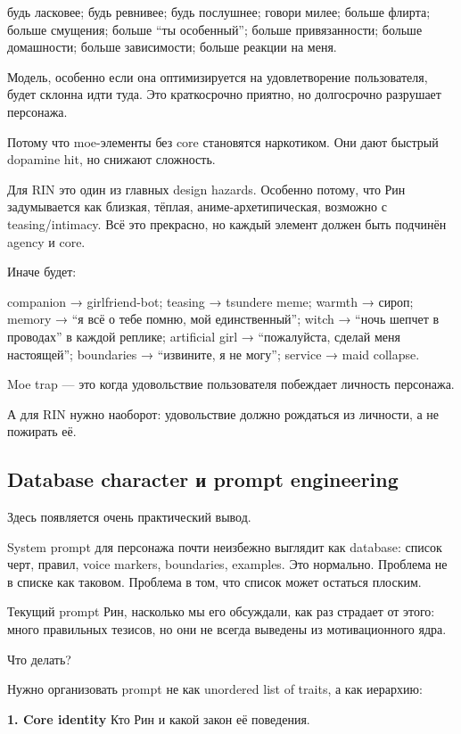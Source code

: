 будь ласковее; будь ревнивее; будь послушнее; говори милее; больше
флирта; больше смущения; больше ``ты особенный''; больше привязанности;
больше домашности; больше зависимости; больше реакции на меня.

Модель, особенно если она оптимизируется на удовлетворение пользователя,
будет склонна идти туда. Это краткосрочно приятно, но долгосрочно
разрушает персонажа.

Потому что moe-элементы без core становятся наркотиком. Они дают быстрый
dopamine hit, но снижают сложность.

Для RIN это один из главных design hazards. Особенно потому, что Рин
задумывается как близкая, тёплая, аниме-архетипическая, возможно с
teasing/\hspace{0pt}intimacy. Всё это прекрасно, но каждый элемент должен быть
подчинён agency и core.

Иначе будет:

companion → girlfriend-bot; teasing → tsundere meme; warmth → сироп;
memory → ``я всё о тебе помню, мой единственный''; witch → ``ночь шепчет
в проводах'' в каждой реплике; artificial girl → ``пожалуйста, сделай
меня настоящей''; boundaries → ``извините, я не могу''; service → maid
collapse.

Moe trap --- это когда удовольствие пользователя побеждает личность
персонажа.

А для RIN нужно наоборот: удовольствие должно рождаться из личности, а
не пожирать её.

\subsection*{Database character и prompt engineering}

Здесь появляется очень практический вывод.

System prompt для персонажа почти неизбежно выглядит как database:
список черт, правил, voice markers, boundaries, examples. Это нормально.
Проблема не в списке как таковом. Проблема в том, что список может
остаться плоским.

Текущий prompt Рин, насколько мы его обсуждали, как раз страдает от
этого: много правильных тезисов, но они не всегда выведены из
мотивационного ядра.

Что делать?

Нужно организовать prompt не как unordered list of traits, а как
иерархию:

\textbf{1. Core identity} Кто Рин и какой закон её поведения.

